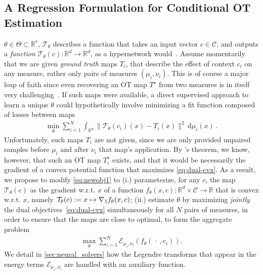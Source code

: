 \subsection{A Regression Formulation for Conditional OT Estimation}
 $\theta\in\Theta\subset\mathbb{R}^r$, $\mathcal{T}_\theta$ describes a function that takes an input vector $c\in\mathcal{C}$, and outputs a \textit{function} $\mathcal{T}_\theta(c):\mathbb{R}^d\rightarrow\mathbb{R}^d$, as a hypernetwork would~\citep{ha2016hypernetworks}. Assume momentarily that we are given \textit{ground truth} maps $T_i$, that describe the effect of context $c_i$ on any measure, rather only pairs of measures $(\mu_i,\nu_i)$. This is of course a major leap of faith since even recovering an OT map $T^\star$ from two measures is in itself very challenging~\citep{hutter2021minimax,rigollet2022sample,pooladian2021entropic}. If such maps were available, a direct supervised approach to learn a unique $\theta$ could hypothetically involve minimizing a fit function composed of losses between maps
\begin{align}\label{eq:newobj1}
\min_\theta \sum_{i=1}^N \int_{\mathbb{R}^d} \|\mathcal{T}_{\theta}(c_i)(x) - T_i(x)\|^2\, \mathrm{d}\mu_i(x)\,.
\end{align}
Unfortunately, such maps $T_i$ are not given, since we are only provided unpaired samples before $\mu_i$ and after $\nu_i$ that map's application.
By \citeauthor{brenier1987decomposition}'s theorem, we know, however, that such an OT map $T^\star_i$ exists, and that it would be necessarily the gradient of a convex potential function that maximizes \eqref{eq:dual-cvx}. As a result, we propose to modify \eqref{eq:newobj1} to (i.) parameterize, for any $c$, the map $\mathcal{T}_\theta(c)$ as the gradient w.r.t. $x$ of a function $f_\theta(x,c):\mathbb{R}^d\times \mathcal{C}\rightarrow \mathbb{R}$ that is convex w.r.t. $x$, namely $\mathcal{T}_\theta(c) := x \mapsto \nabla_1 f_\theta(x,c)$; (ii.) estimate $\theta$ by maximizing \textit{jointly} the dual objectives~\eqref{eq:dual-cvx} simultaneously for all $N$ pairs of measures, in order to ensure that the maps are close to optimal, to form the aggregate problem
\begin{align}\label{eq:supdual} 
\textstyle \max_\theta \sum_{i=1}^N \mathcal{E}_{\mu_i,\nu_i}(f_{\theta}(\,\cdot\,, c_i)).
\end{align}
We detail in \cref{sec:neural_solvers} how the Legendre transforms that appear in the energy terms $\mathcal{E}_{\mu_i,\nu_i}$ are handled with an auxiliary function.

